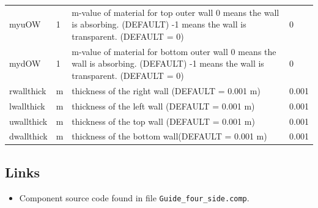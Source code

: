 \begin{longtable}{p{}p{}p{}p{}}
myuOW & 1 & m-value of material for top outer wall 0 means the wall is absorbing. (DEFAULT) -1 means the wall is transparent. (DEFAULT = 0) & 0 \\
mydOW & 1 & m-value of material for bottom outer wall 0 means the wall is absorbing. (DEFAULT) -1 means the wall is transparent. (DEFAULT = 0) & 0 \\
rwallthick & m & thickness of the right wall (DEFAULT = 0.001 m) & 0.001 \\
lwallthick & m & thickness of the left wall  (DEFAULT = 0.001 m) & 0.001 \\
uwallthick & m & thickness of the top wall   (DEFAULT = 0.001 m) & 0.001 \\
dwallthick & m & thickness of the bottom wall(DEFAULT = 0.001 m) & 0.001 \\
\bottomrule
\end{longtable}

\subsection*{Links}
\begin{itemize}
  \item Component source code found in file \texttt{Guide\_four\_side.comp}.
\end{itemize}

